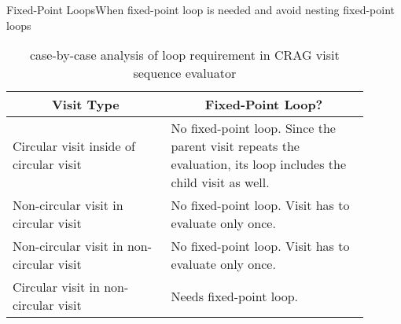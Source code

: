 \begin{frame}{Fixed-Point Loops}{When fixed-point loop is needed and avoid nesting fixed-point loops}

\begin{table}
\centering
\footnotesize
\begin{tabular}{|p{0.4\linewidth} | p{0.5\linewidth}|}
\hline
\multicolumn{1}{|c|}{Visit Type} & \multicolumn{1}{c|}{Fixed-Point Loop?}   \\ 
\hline\hline
Circular visit inside of circular visit & No fixed-point loop. Since the parent visit repeats the evaluation, its loop includes the child visit as well.\\ \hline
Non-circular visit in circular visit & No fixed-point loop. Visit has to evaluate only once. \\ \hline
Non-circular visit in non-circular visit & No fixed-point loop. Visit has to evaluate only once. \\ \hline
Circular visit in non-circular visit & Needs fixed-point loop. \\ \hline
\end{tabular}\caption{case-by-case analysis of loop requirement in CRAG visit sequence evaluator}\label{table:case-by-case-fixed-point-loop}
\end{table}

\end{frame}